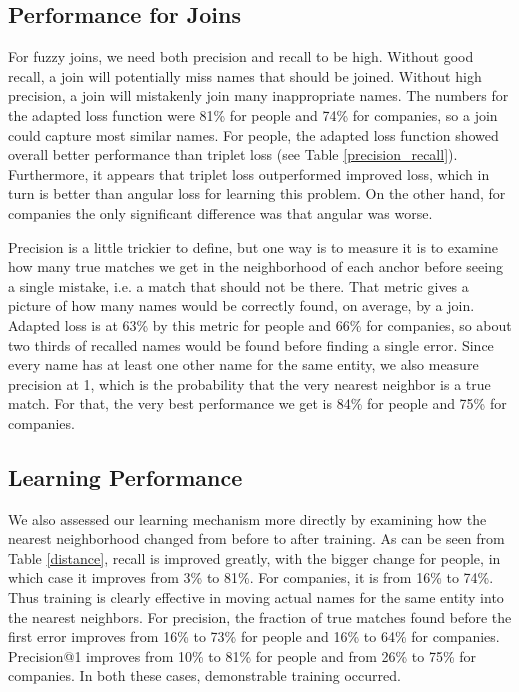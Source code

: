 \subsection{Performance for Joins}
For fuzzy joins, we need both precision and recall to be high.  Without good recall, a join will potentially miss names that should be joined.  Without high precision, a join will mistakenly join many inappropriate names.  The numbers for the adapted loss function were 81\% for people and 74\% for companies, so a join could capture most similar names.  For people, the adapted loss function showed overall better performance than triplet loss (see Table \ref{precision_recall}).  Furthermore, it appears that triplet loss outperformed improved loss, which in turn is better than angular loss for learning this problem.  On the other hand, for companies the only significant difference was that angular was worse.

 Precision is a little trickier to define, but one way is to measure it is to examine how many true matches we get in the neighborhood of each anchor before seeing a single mistake, i.e. a match that should not be there.  That metric gives a picture of how many names would be correctly found, on average, by a join.  Adapted loss is at 63\% by this metric for people and 66\% for companies, so about two thirds of recalled names would be found before finding a single error.  Since every name has at least one other name for the same entity, we also measure precision at 1, which is the probability that the very nearest neighbor is a true match.  For that, the very best performance we get is 84\% for people and 75\% for companies.  


\subsection{Learning Performance}

 We also assessed our learning mechanism more directly by examining how the nearest neighborhood changed from before to after training.  As can be seen from Table \ref{distance}, recall is improved greatly, with the bigger change for people, in which case it improves from 3\% to 81\%.  For companies, it is from 16\% to 74\%.  Thus training is clearly effective in moving actual names for the same entity into the nearest neighbors.  For precision, the fraction of true matches found before the first error improves from 16\% to 73\% for people and 16\% to 64\% for companies.  Precision@1 improves from 10\% to 81\% for people and from 26\% to 75\% for companies.  In both these cases, demonstrable training occurred.

